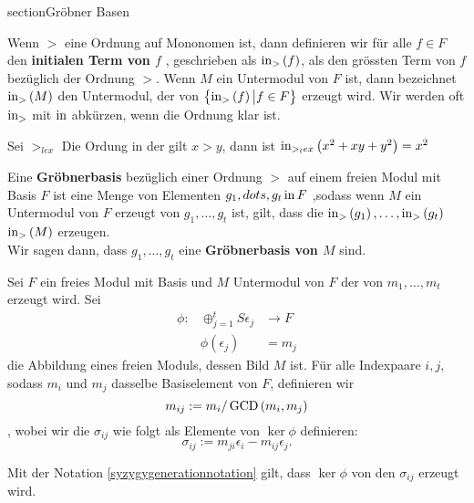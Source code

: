 \documentclass{article}
\begin{document}
section{Gr\"obner Basen}
\begin{defn}
	Wenn 
	\( > \)
	eine Ordnung auf Mononomen ist,
	dann definieren wir f\"ur alle 
	\( f \in F \)
	den \textbf{initialen Term von \( f\) },
	geschrieben als 
	\( \operatorname{in}_{>} \left( f \right) \),
	als den gr\"ossten Term von 
	\( f \) 
	bez\"uglich der Ordnung
	\( > \).
	Wenn 
	\( M \) 
	ein Untermodul von 
	\( F \) 
	ist,
	dann bezeichnet 
	\( \operatorname{in}_{>} \left( M \right) \)
	den Untermodul, 
	der von 
	\( \left\{ \operatorname{in}_{>} \left( f \right) \big| f \in F \right\}\)
	erzeugt wird.
	Wir werden oft 
	\( \operatorname{in}_{>} \)
	mit 
	\( \operatorname{in} \)
	abk\"urzen,
	wenn die Ordnung klar ist.
\end{defn}
\begin{bsp}
	Sei 
	\( >_{lex} \) 
	Die Ordung in der gilt
	\( x > y \),
	dann ist 
	\( \operatorname{in}_{>_lex} \left( x^{2}+xy +y^{2} \right)=x^{2} \)

\end{bsp}
\begin{defn}
	Eine \textbf{Gr\"obnerbasis} bez\"uglich einer Ordnung 
	\( > \)
	auf einem freien Modul mit Basis
	\(F \)
	ist eine Menge von Elementen
	\( g_{1},dots,g_{t} \operatorname{in} F \)
	,sodass wenn 
	\( M \) 
	ein Untermodul von 
	\( F \) 
	erzeugt von
	\( g_{1}, \dots , g_{t} \)
	ist,
	gilt, dass die
	\( \operatorname{in}_{>}  \left(  g_{1} \right),
	\dots,
	\operatorname{in}_{>} \left( g_{t} \right) \)
	\( \operatorname{in}_{>} \left( M \right) \)
	erzeugen. \\
	Wir sagen dann,
	dass
	\( g_{1},\dots,g_{t} \)
	eine
	\textbf{Gr\"obnerbasis von \( M \)}
	sind.

\end{defn}

\begin{nota}
	Sei 
	\( F \) 
	ein freies Modul mit Basis 
	und
	\( M \)
	Untermodul von 
	\( F \)
	der von 
	\( m_{1} , \dots , m_{t} \)
	erzeugt wird.
	Sei
	\begin{align*}
		\phi:	& \oplus_{j=1}^{t} S\epsilon_{j} &\to   F \\
			& \phi\left( \epsilon_{j} \right) &=  m_{j}
	\end{align*}
	die Abbildung eines freien Moduls, dessen Bild
	\( M \)
	ist.
	F\"ur alle Indexpaare 	
	\( i,j \),
	sodass 
	\( m_{i}\)
	und 
	\( m_{j}\)
	dasselbe Basiselement von 
	\( F \),
	definieren wir 
	\[
		m_{ij} := m_{i}/\operatorname{GCD}\left( m_{i},m_{j} \right) 
	\],
	wobei wir die 
	\( \sigma_{ij}\)
	wie folgt als Elemente von 
	\( \ker \phi \)
	definieren:
	\[
		\sigma_{ij} := m_{ji}\epsilon_{i}-m_{ij}\epsilon_{j} .
	\]

\end{nota}

\begin{lem}
	Mit der Notation  \ref{syzygygenerationnotation} gilt,
	dass 
	\( \ker \phi \)
	von den
	\( \sigma_{ij} \)
	erzeugt wird.
\end{lem}


\end{document}
